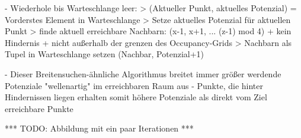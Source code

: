 - Wiederhole bis Warteschlange leer:
	> (Aktueller Punkt, aktuelles Potenzial) = Vorderstes Element in Warteschlange
	> Setze aktuelles Potenzial für aktuellen Punkt
	> finde aktuell erreichbare Nachbarn: (x-1, x+1, ... (z-1) mod 4) + kein Hindernis + nicht außerhalb der grenzen des Occupancy-Grids
	> Nachbarn als Tupel in Warteschlange setzen (Nachbar, Potenzial+1)

- Dieser Breitensuchen-ähnliche Algorithmus breitet immer größer werdende Potenziale "wellenartig" im erreichbaren Raum aus
- Punkte, die hinter Hindernissen liegen erhalten somit höhere Potenziale als direkt vom Ziel erreichbare Punkte

*** TODO: Abbildung mit ein paar Iterationen ***



